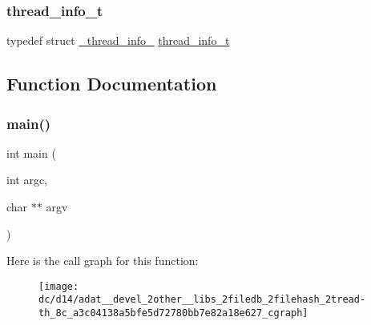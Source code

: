 \subsubsection{\texorpdfstring{thread\_info\_t}{thread\_info\_t}}
{\footnotesize\ttfamily typedef struct \mbox{\hyperlink{struct__thread__info__}{\+\_\+thread\+\_\+info\+\_\+}} \mbox{\hyperlink{adat-devel_2other__libs_2filedb_2filehash_2tread-th_8c_a9b5e9da8d3952d6ccc173282d0a5fcf8}{thread\+\_\+info\+\_\+t}}}



\subsection{Function Documentation}
\mbox{\label{adat__devel_2other__libs_2filedb_2filehash_2tread-th_8c_a3c04138a5bfe5d72780bb7e82a18e627}} 
\subsubsection{\texorpdfstring{main()}{main()}}
{\footnotesize\ttfamily int main (\begin{DoxyParamCaption}\item[{int}]{argc,  }\item[{char $\ast$$\ast$}]{argv }\end{DoxyParamCaption})}

Here is the call graph for this function\+:
\nopagebreak
\begin{figure}[H]
\begin{center}
\leavevmode
\texttt{[image: dc/d14/adat\_\_devel\_2other\_\_libs\_2filedb\_2filehash\_2tread-th\_8c\_a3c04138a5bfe5d72780bb7e82a18e627\_cgraph]}
\end{center}
\end{figure}
